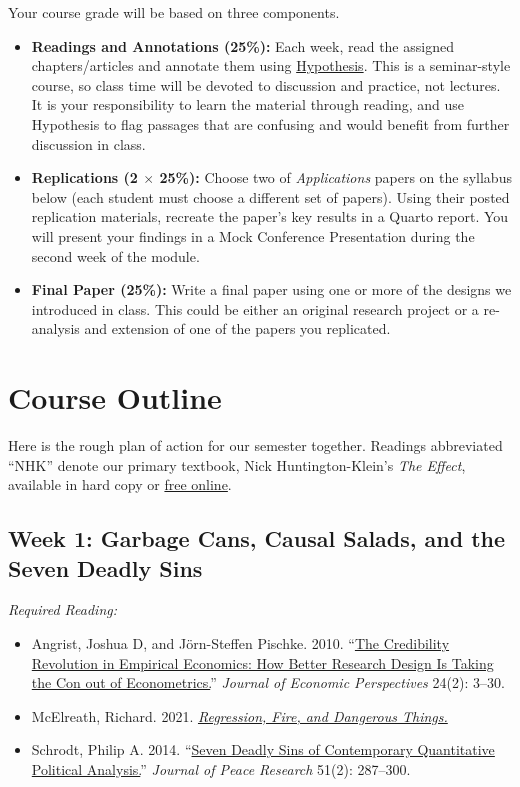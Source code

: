 \documentclass[11pt, letterpaper]{article}
\begin{document}
Your course grade will be based on three components.

\begin{itemize}
	\item \textbf{Readings and Annotations (25\%):} Each week, read the assigned chapters/articles and annotate them using \href{https://hypothes.is/groups/Qm2VnAae/causal-inference}{Hypothesis}. This is a seminar-style course, so class time will be devoted to discussion and practice, not lectures. It is your responsibility to learn the material through reading, and use Hypothesis to flag passages that are confusing and would benefit from further discussion in class.
	\item \textbf{Replications (2 $\times$ 25\%):} Choose two of \textit{Applications} papers on the syllabus below (each student must choose a different set of papers). Using their posted replication materials, recreate the paper's key results in a Quarto report. You will present your findings in a Mock Conference Presentation during the second week of the module.
	\item \textbf{Final Paper (25\%):} Write a final paper using one or more of the designs we introduced in class. This could be either an original research project or a re-analysis and extension of one of the papers you replicated.
\end{itemize}


\section*{Course Outline}

Here is the rough plan of action for our semester together. Readings abbreviated ``NHK'' denote our primary textbook, Nick Huntington-Klein's \textit{The Effect}, available in hard copy or \href{https://theeffectbook.net/}{free online}.

\subsection*{Week 1: Garbage Cans, Causal Salads, and the Seven Deadly Sins}

\textit{Required Reading:}

\begin{itemize}
	\item Angrist, Joshua D, and Jörn-Steffen Pischke. 2010. ``\href{https://pubs.aeaweb.org/doi/pdfplus/10.1257/jep.24.2.3}{The Credibility Revolution in Empirical Economics: How Better Research Design Is Taking the Con out of Econometrics.}'' \textit{Journal of Economic Perspectives} 24(2): 3–30.
	\item McElreath, Richard. 2021. \href{https://elevanth.org/blog/2021/06/15/regression-fire-and-dangerous-things-1-3/}{\textit{Regression, Fire, and Dangerous Things.}}
	\item Schrodt, Philip A. 2014. ``\href{https://journals.sagepub.com/doi/pdf/10.1177/0022343313499597}{Seven Deadly Sins of Contemporary Quantitative Political Analysis.}'' \textit{Journal of Peace Research} 51(2): 287–300.
\end{itemize}
\end{document}
